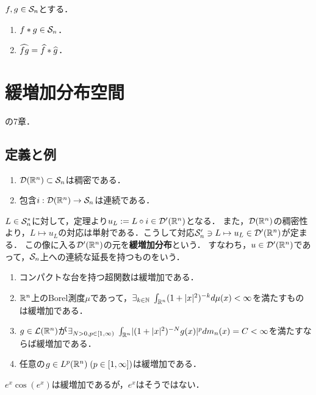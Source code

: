 \documentclass[uplatex,dvipdfmx]{jsreport}
\begin{document}
\begin{theorem}
    $f,g\in\S_n$とする．
    \begin{enumerate}
        \item $f*g\in\S_n$．
        \item $\wh{fg}=\wh{f}*\wh{g}$．
    \end{enumerate}
\end{theorem}

\section{緩増加分布空間}

\begin{tcolorbox}[colframe=ForestGreen, colback=ForestGreen!10!white,breakable,colbacktitle=ForestGreen!40!white,coltitle=black,fonttitle=\bfseries\sffamily,
title=]
    \cite{Rudin-FA}の7章．
\end{tcolorbox}

\subsection{定義と例}

\begin{theorem}\mbox{}
    \begin{enumerate}
        \item $\D(\R^n)\subset\S_n$は稠密である．
        \item 包含$i:\D(\R^n)\to\S_n$は連続である．
    \end{enumerate}
\end{theorem}

\begin{definition}
    $L\in\S_n^*$に対して，定理より$u_L:=L\circ i\in\D'(\R^n)$となる．
    また，$\D(\R^n)$の稠密性より，$L\mapsto u_L$の対応は単射である．こうして対応$\S'_n\ni L\mapsto u_L\in\D'(\R^n)$が定まる．
    この像に入る$\D'(\R^n)$の元を\textbf{緩増加分布}という．
    すなわち，$u\in\D'(\R^n)$であって，$\S_n$上への連続な延長を持つものをいう．
\end{definition}

\begin{example}[任意の可積分関数は緩増加である]\mbox{}
    \begin{enumerate}
        \item コンパクトな台を持つ超関数は緩増加である．
        \item $\R^n$上のBorel測度$\mu$であって，$\exists_{k\in\N}\;\int_{\R^n}(1+\abs{x}^2)^{-k}d\mu(x)<\infty$を満たすものは緩増加である．
        \item $g\in\L(\R^n)$が$\exists_{N>0,p\in[1,\infty)}\;\int_{\R^n}\abs{(1+\abs{x}^2)^{-N}g(x)}^pdm_n(x)=C<\infty$を満たすならば緩増加である．
        \item 任意の$g\in L^p(\R^n)\;(p\in[1,\infty])$は緩増加である．
    \end{enumerate}
    $e^x\cos(e^x)$は緩増加であるが，$e^x$はそうではない．
\end{example}
\end{document}
